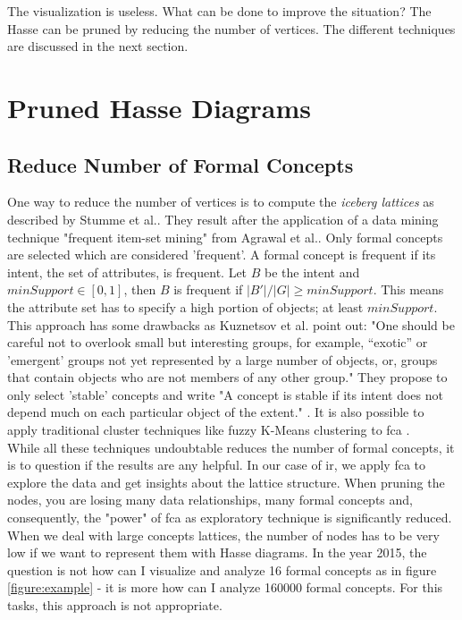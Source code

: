 \documentclass[11pt]{report}
\begin{document}
{{The visualization is useless. What can be done to improve the situation? The Hasse can be pruned by reducing the number of vertices. The different techniques are discussed in the next section.

\section{Pruned Hasse Diagrams}

\subsection{Reduce Number of Formal Concepts}

One way to reduce the number of vertices is to compute the \textit{iceberg lattices} as described by Stumme et al.\cite{Stumme2002}. They result after the application of a data mining technique "frequent item-set mining" from Agrawal et al.\cite{Agrawal1993}. Only formal concepts are selected which are considered 'frequent'. A formal concept is frequent if its intent, the set of attributes, is frequent. Let $B$ be the intent and $minSupport \in [0, 1]$, then $B$ is frequent if $ |B'|/|G| \geq minSupport$. This means the attribute set has to specify a high portion of objects; at least $minSupport$. \\

 This approach has some drawbacks as Kuznetsov et al. \cite{Kuznetsov20072} point out: "One should be careful not to overlook small but interesting groups, for example, “exotic” or 'emergent' groups not yet represented by a large number of objects, or, groups that contain objects who are not members of any other group." They propose to only select 'stable' concepts and write "A concept is stable if its intent does not depend much on each particular object of the extent." \cite{Kuznetsov20072}. It is also possible to apply traditional cluster techniques like fuzzy K-Means clustering to \acrshort{fca} \cite{AswaniKumar2010}. \\

	While all these techniques undoubtable reduces the number of formal concepts, it is to question if the results are any helpful. In our case of \acrshort{ir}, we apply \acrshort{fca} to explore the data and get insights about the lattice structure. When pruning the nodes, you are losing many data relationships, many formal concepts and, consequently, the "power" of \acrshort{fca} as exploratory technique is significantly reduced. When we deal with large concepts lattices, the number of nodes has to be very low if we want to represent them with Hasse diagrams. In the year 2015, the question is not how can I visualize and analyze 16 formal concepts as in figure \ref{figure:example} - it is more how can I analyze 160000 formal concepts. For this tasks, this approach is not appropriate. \\
	
}}
\end{document}
